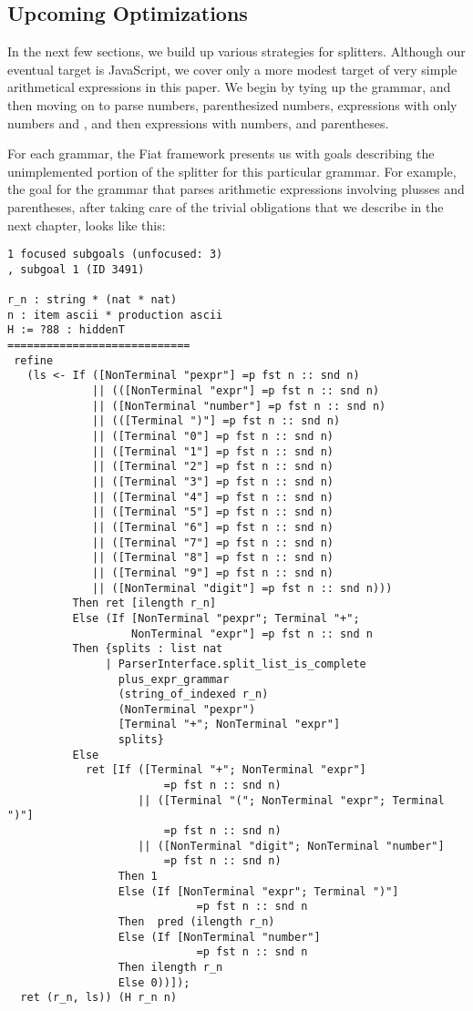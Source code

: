  \subsection{Upcoming Optimizations}
    In the next few sections, we build up various strategies for splitters.  Although our eventual target is JavaScript, we cover only a more modest target of very simple arithmetical expressions in this paper.  We begin by tying up the  grammar, and then moving on to parse numbers, parenthesized numbers, expressions with only numbers and \terminal{+}, and then expressions with numbers, \terminal{+} and parentheses. 
    
    For each grammar, the Fiat framework presents us with goals describing the unimplemented portion of the splitter for this particular grammar.  For example, the goal for the grammar that parses arithmetic expressions involving plusses and parentheses, after taking care of the trivial obligations that we describe in the next chapter, looks like this:
\begin{verbatim}
1 focused subgoals (unfocused: 3)
, subgoal 1 (ID 3491)
  
r_n : string * (nat * nat)
n : item ascii * production ascii
H := ?88 : hiddenT
============================
 refine
   (ls <- If ([NonTerminal "pexpr"] =p fst n :: snd n)
             || (([NonTerminal "expr"] =p fst n :: snd n)
             || ([NonTerminal "number"] =p fst n :: snd n)
             || (([Terminal ")"] =p fst n :: snd n)
             || ([Terminal "0"] =p fst n :: snd n)
             || ([Terminal "1"] =p fst n :: snd n)
             || ([Terminal "2"] =p fst n :: snd n)
             || ([Terminal "3"] =p fst n :: snd n)
             || ([Terminal "4"] =p fst n :: snd n)
             || ([Terminal "5"] =p fst n :: snd n)
             || ([Terminal "6"] =p fst n :: snd n)
             || ([Terminal "7"] =p fst n :: snd n)
             || ([Terminal "8"] =p fst n :: snd n)
             || ([Terminal "9"] =p fst n :: snd n)
             || ([NonTerminal "digit"] =p fst n :: snd n)))
          Then ret [ilength r_n]
          Else (If [NonTerminal "pexpr"; Terminal "+";
                   NonTerminal "expr"] =p fst n :: snd n
          Then {splits : list nat
               | ParserInterface.split_list_is_complete
                 plus_expr_grammar
                 (string_of_indexed r_n)
                 (NonTerminal "pexpr")
                 [Terminal "+"; NonTerminal "expr"]
                 splits}
          Else
            ret [If ([Terminal "+"; NonTerminal "expr"]
                        =p fst n :: snd n)
                    || ([Terminal "("; NonTerminal "expr"; Terminal ")"]
                        =p fst n :: snd n)
                    || ([NonTerminal "digit"; NonTerminal "number"]
                        =p fst n :: snd n)
                 Then 1
                 Else (If [NonTerminal "expr"; Terminal ")"]
                             =p fst n :: snd n 
                 Then  pred (ilength r_n)
                 Else (If [NonTerminal "number"]
                             =p fst n :: snd n 
                 Then ilength r_n
                 Else 0))]);
  ret (r_n, ls)) (H r_n n)
\end{verbatim}
